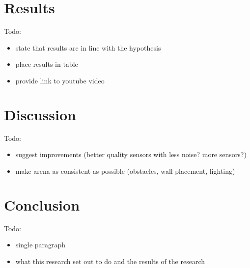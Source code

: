 \documentclass[a4paper,12pt,twocolumn]{article}
\begin{document}
\section{Results}

Todo:
\begin{itemize}
    \item state that results are in line with the hypothesis
    \item place results in table
    \item provide link to youtube video
\end{itemize}


\section{Discussion}

Todo:
\begin{itemize}
    \item suggest improvements (better quality sensors with less noise? more sensors?)
    \item make arena as consistent as possible (obstacles, wall placement, lighting)
\end{itemize}


\section{Conclusion}

Todo:
\begin{itemize}
    \item single paragraph
    \item what this research set out to do and the results of the research
\end{itemize}



\end{document}
